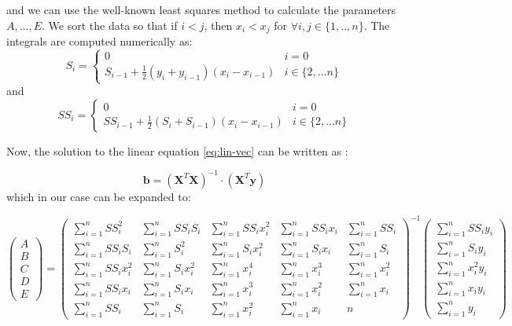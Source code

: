 and we can use the well-known least squares method to calculate the parameters $A,...,E$. We sort the data so that if $i<j$, then $x_i<x_j$ for $\forall i,j \in \{1,..,n\}$. The integrals are computed numerically as:
\begin{equation}
	S_i = \left\{
	\begin{array}{ll}
		0 & i=0 \\
		S_{i-1} + \frac{1}{2}(y_i+y_{i-1})(x_i-x_{i-1}) & i\in\{2,...n\}
	\end{array}
	\right.
\end{equation}
and
\begin{equation}
	SS_i = \left\{
	\begin{array}{ll}
		0 & i=0 \\
		SS_{i-1} + \frac{1}{2}(S_i+S_{i-1})(x_i-x_{i-1}) & i\in\{2,...n\}
	\end{array}
	\right.
\end{equation}

Now, the solution to the linear equation \ref{eq:lin-vec} can be written as \cite{lin-reg}:

\begin{equation}
	\boldsymbol{b}=\left(\boldsymbol{X}^T\boldsymbol{X}\right)^{-1}\cdot (\boldsymbol{X}^T\boldsymbol{y})
\end{equation}
which in our case can be expanded to:

\begin{equation}
	\label{eq:lin-reg}
	\begin{pmatrix}
		A \\
		B \\
		C \\
		D \\
		E  
	\end{pmatrix} 
	=
	\begin{pmatrix}
		\sum\limits_{i=1}^nSS_i^2 & \sum\limits_{i=1}^nSS_iS_i & \sum\limits_{i=1}^nSS_ix_i^2 & \sum\limits_{i=1}^nSS_ix_i & \sum\limits_{i=1}^nSS_i \\
		\sum\limits_{i=1}^nSS_iS_i & \sum\limits_{i=1}^nS_i^2 & \sum\limits_{i=1}^nS_ix_i^2 & \sum\limits_{i=1}^nS_ix_i & \sum\limits_{i=1}^nS_i \\
		\sum\limits_{i=1}^nSS_ix_i^2 & \sum\limits_{i=1}^nS_ix_i^2 & \sum\limits_{i=1}^nx_i^4 & \sum\limits_{i=1}^nx_i^3 & \sum\limits_{i=1}^nx_i^2 \\
		\sum\limits_{i=1}^nSS_ix_i & \sum\limits_{i=1}^nS_ix_i & \sum\limits_{i=1}^nx_i^3 & \sum\limits_{i=1}^nx_i^2 & \sum\limits_{i=1}^nx_i \\
		\sum\limits_{i=1}^nSS_i & \sum\limits_{i=1}^nS_i & \sum\limits_{i=1}^nx_i^2 & \sum\limits_{i=1}^nx_i & n  
	\end{pmatrix}^{-1}
	\begin{pmatrix}
		\sum\limits_{i=1}^nSS_iy_i \\
		\sum\limits_{i=1}^nS_iy_i \\
		\sum\limits_{i=1}^nx_i^2y_i \\
		\sum\limits_{i=1}^nx_iy_i \\
		\sum\limits_{i=1}^ny_i  
	\end{pmatrix}
\end{equation}

